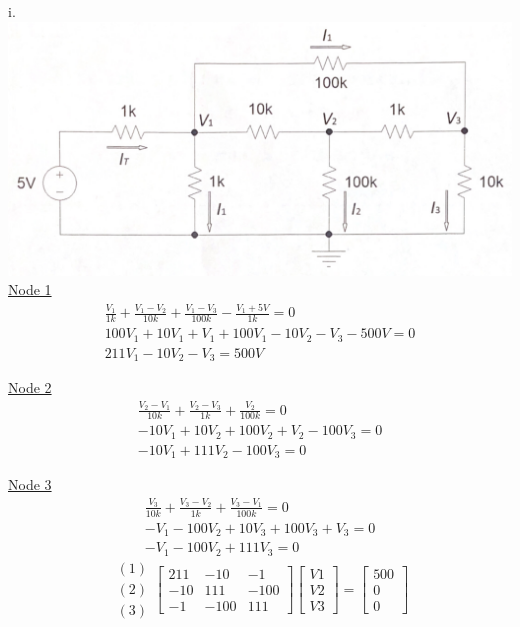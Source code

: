 \documentclass[12pt]{article}
\begin{document}
\thispagestyle{prelabheader}
i. \\
\includegraphics[width=\textwidth]{Circuit} \\

\underline{Node 1}
\begin{multline}
\frac{V_1}{1k} + \frac{V_1-V_2}{10k} + \frac{V_1-V_3}{100k} - \frac{V_1+5V}{1k} = 0 \\
100V_1 + 10V_1 + V_1 + 100V_1 - 10V_2 - V_3 - 500V = 0 \\
211V_1 - 10V_2 - V_3 = 500V
\end{multline}

\underline{Node 2}
\begin{multline}
\frac{V_2-V_1}{10k} + \frac{V_2-V_3}{1k} + \frac{V_2}{100k} = 0 \\
-10V_1 + 10V_2 + 100V_2 + V_2 - 100V_3 = 0 \\
-10V_1 + 111V_2 - 100V_3 = 0
\end{multline}

\underline{Node 3}
\begin{multline}
\frac{V_3}{10k} + \frac{V_3-V_2}{1k} + \frac{V_3-V_1}{100k} = 0\\
-V_1 - 100V_2 + 10V_3 + 100V_3 + V_3 = 0 \\
-V_1 - 100V_2 + 111V_3 = 0    
\end{multline}
\restoregeometry
\clearpage
\[
\begin{matrix}
    (1) \\
    (2) \\
    (3)    
\end{matrix}
\begin{bmatrix}
    211 & -10 & -1 \\
    -10 & 111 & -100 \\
    -1 & -100 & 111
\end{bmatrix}
\begin{bmatrix}
    V1 \\
    V2 \\
    V3
\end{bmatrix}
=
\begin{bmatrix}
    500 \\
    0 \\
    0
\end{bmatrix}
\]
\end{document}
